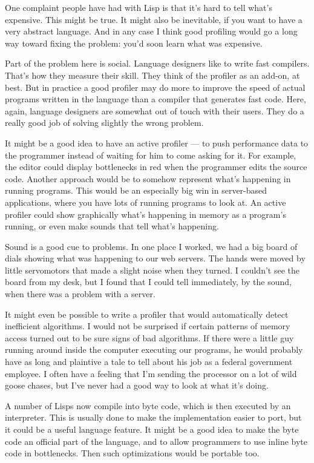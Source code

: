 One complaint people have had with Lisp is that it's hard to tell what's
expensive. This might be true. It might also be inevitable, if you want
to have a very abstract language. And in any case I think good profiling
would go a long way toward fixing the problem: you'd soon learn what was
expensive.

Part of the problem here is social. Language designers like to write
fast compilers. That's how they measure their skill. They think of the
profiler as an add-on, at best. But in practice a good profiler may do
more to improve the speed of actual programs written in the language
than a compiler that generates fast code. Here, again, language
designers are somewhat out of touch with their users. They do a really
good job of solving slightly the wrong problem.

It might be a good idea to have an active profiler --- to push
performance data to the programmer instead of waiting for him to come
asking for it. For example, the editor could display bottlenecks in red
when the programmer edits the source code. Another approach would be to
somehow represent what's happening in running programs. This would be an
especially big win in server-based applications, where you have lots of
running programs to look at. An active profiler could show graphically
what's happening in memory as a program's running, or even make sounds
that tell what's happening.

Sound is a good cue to problems. In one place I worked, we had a big
board of dials showing what was happening to our web servers. The hands
were moved by little servomotors that made a slight noise when they
turned. I couldn't see the board from my desk, but I found that I could
tell immediately, by the sound, when there was a problem with a server.

It might even be possible to write a profiler that would automatically
detect inefficient algorithms. I would not be surprised if certain
patterns of memory access turned out to be sure signs of bad algorithms.
If there were a little guy running around inside the computer executing
our programs, he would probably have as long and plaintive a tale to
tell about his job as a federal government employee. I often have a
feeling that I'm sending the processor on a lot of wild goose chases,
but I've never had a good way to look at what it's doing.

A number of Lisps now compile into byte code, which is then executed by
an interpreter. This is usually done to make the implementation easier
to port, but it could be a useful language feature. It might be a good
idea to make the byte code an official part of the language, and to
allow programmers to use inline byte code in bottlenecks. Then such
optimizations would be portable too.

